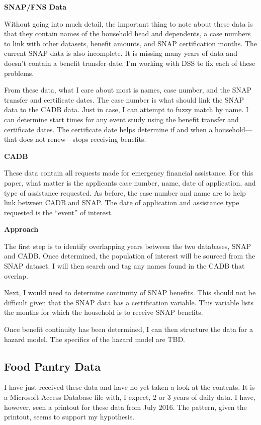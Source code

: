 \documentclass[12pt,letterpaperpaper,]{book}
\begin{document}
\textbf{SNAP/FNS Data}

Without going into much detail, the important thing to note about these
data is that they contain names of the household head and dependents, a
case numbers to link with other datasets, benefit amounts, and SNAP
certification months. The current SNAP data is also incomplete. It is
missing many years of data and doesn't contain a benefit transfer date.
I'm working with DSS to fix each of these problems.

From these data, what I care about most is names, case number, and the
SNAP transfer and certificate dates. The case number is what should link
the SNAP data to the CADB data. Just in case, I can attempt to fuzzy
match by name. I can determine start times for any event study using the
benefit transfer and certificate dates. The certificate date helps
determine if and when a household---that does not renew---stops
receiving benefits.

\textbf{CADB}

These data contain all requests made for emergency financial assistance.
For this paper, what matter is the applicants case number, name, date of
application, and type of assistance requested. As before, the case
number and name are to help link between CADB and SNAP. The date of
application and assistance type requested is the ``event'' of interest.

\textbf{Approach}

The first step is to identify overlapping years between the two
databases, SNAP and CADB. Once determined, the population of interest
will be sourced from the SNAP dataset. I will then search and tag any
names found in the CADB that overlap.

Next, I would need to determine continuity of SNAP benefits. This should
not be difficult given that the SNAP data has a certification variable.
This variable lists the months for which the household is to receive
SNAP benefits.

Once benefit continuity has been determined, I can then structure the
data for a hazard model. The specifics of the hazard model are TBD.

\subsection*{Food Pantry Data}\label{food-pantry-data}

I have just received these data and have no yet taken a look at the
contents. It is a Microsoft Access Database file with, I expect, 2 or 3
years of daily data. I have, however, seen a printout for these data
from July 2016. The pattern, given the printout, seems to support my
hypothesis.
\end{document}

